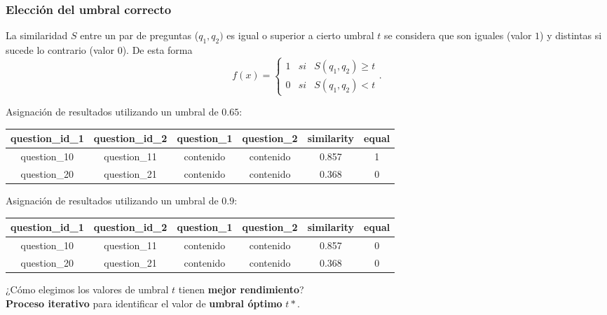 \begin{frame}[allowframebreaks]
	\frametitle{Elección del umbral correcto}
	La similaridad \(S\) entre un par de preguntas (\(q_1,q_2)\) es igual o superior a cierto umbral \(t\) se considera que son iguales (valor \(1\)) y distintas si sucede lo contrario (valor \(0\)). De esta forma
	\[f(x) = \left\{ \begin{array}{lcc} 1 & si & S(q_1, q_2)\geq t
		\\ 0 & si & S(q_1, q_2) < t
	\end{array} \right..\]

	\framebreak

	Asignación de resultados utilizando un umbral de \(0.65\):
	\begin{table}[h!]
		\scriptsize
		\begin{tabularx}{\textwidth}{cccccc}
			\toprule
			\textbf{question\_id\_1} & \textbf{question\_id\_2} & \textbf{question\_1} & \textbf{question\_2}  & \textbf{similarity} & \textbf{equal} \\
			\midrule
			question\_10             & question\_11             & contenido            & contenido            & 0.857  & 1              \\
			question\_20             & question\_21             & contenido            & contenido            & 0.368  & 0              \\
			\bottomrule
		\end{tabularx}
		\label{tab:umbral-validacion-1}
	\end{table}

	Asignación de resultados utilizando un umbral de \(0.9\):
	\begin{table}[h!]
		\scriptsize
		\begin{tabularx}{\textwidth}{cccccc}
			\toprule
			\textbf{question\_id\_1} & \textbf{question\_id\_2} & \textbf{question\_1} & \textbf{question\_2}  & \textbf{similarity} & \textbf{equal} \\
			\midrule
			question\_10             & question\_11             & contenido            & contenido            & 0.857 & 0              \\
			question\_20             & question\_21             & contenido            & contenido            & 0.368 & 0              \\
			\bottomrule
		\end{tabularx}
		\label{tab:umbral-validacion-2}
	\end{table}

	\begin{center}
		¿Cómo elegimos los valores de umbral \(t\) tienen \textbf{mejor rendimiento}? \\
		\bigskip
		\textbf{Proceso iterativo} para identificar el valor de \textbf{umbral óptimo} \(t*\).
	\end{center}
\end{frame}